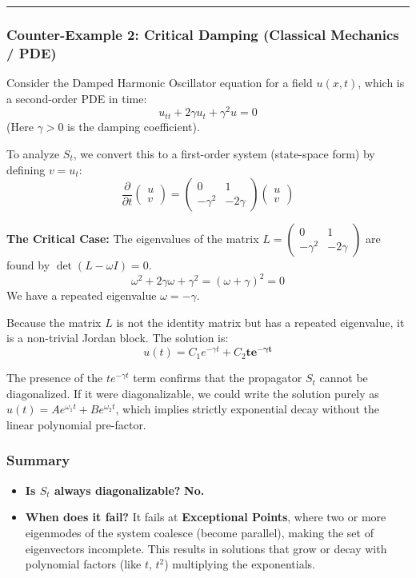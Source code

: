 \documentclass[oneside]{book}
\begin{document}
\noindent\rule{\textwidth}{0.4pt}

\subsubsection*{Counter-Example 2: Critical Damping (Classical Mechanics / PDE)}
Consider the Damped Harmonic Oscillator equation for a field $u(x,t)$, which is a second-order PDE in time:
\[ u_{tt} + 2\gamma u_t + \gamma^2 u = 0 \]
(Here $\gamma > 0$ is the damping coefficient).

To analyze $S_t$, we convert this to a first-order system (state-space form) by defining $v = u_t$:
\[ \frac{\partial}{\partial t} \begin{pmatrix} u \\ v \end{pmatrix} = \begin{pmatrix} 0 & 1 \\ -\gamma^2 & -2\gamma \end{pmatrix} \begin{pmatrix} u \\ v \end{pmatrix} \]

\textbf{The Critical Case:}
The eigenvalues of the matrix $L = \begin{pmatrix} 0 & 1 \\ -\gamma^2 & -2\gamma \end{pmatrix}$ are found by $\det(L - \omega I) = 0$.
\[ \omega^2 + 2\gamma \omega + \gamma^2 = (\omega + \gamma)^2 = 0 \]
We have a repeated eigenvalue $\omega = -\gamma$.

Because the matrix $L$ is not the identity matrix but has a repeated eigenvalue, it is a non-trivial Jordan block. The solution is:
\[ u(t) = C_1 e^{-\gamma t} + C_2 \mathbf{t e^{-\gamma t}} \]

The presence of the $t e^{-\gamma t}$ term confirms that the propagator $S_t$ cannot be diagonalized. If it were diagonalizable, we could write the solution purely as $u(t) = A e^{\omega_1 t} + B e^{\omega_2 t}$, which implies strictly exponential decay without the linear polynomial pre-factor.

\subsubsection*{Summary}
\begin{itemize}
    \item \textbf{Is $S_t$ always diagonalizable?} \textbf{No.}
    \item \textbf{When does it fail?} It fails at \textbf{Exceptional Points}, where two or more eigenmodes of the system coalesce (become parallel), making the set of eigenvectors incomplete. This results in solutions that grow or decay with polynomial factors (like $t$, $t^2$) multiplying the exponentials.
\end{itemize}
\end{document}

